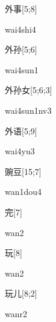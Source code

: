 \begin{verbete}{外事}[5;8]
\begin{pronuncia}{wai4shi4}
\end{pronuncia}
\end{verbete}

\begin{verbete}{外孙}[5;6]
\begin{pronuncia}{wai4sun1}
\end{pronuncia}
\end{verbete}

\begin{verbete}{外孙女}[5;6;3]
\begin{pronuncia}{wai4sun1nv3}
\end{pronuncia}
\end{verbete}

\begin{verbete}[wai4yu3]{外语}[5;9]
\begin{pronuncia}{wai4yu3}
\end{pronuncia}
\end{verbete}

\begin{verbete}{豌豆}[15;7]
\begin{pronuncia}{wan1dou4}
\end{pronuncia}
\end{verbete}

\begin{verbete}[wan2]{完}[7]
\begin{pronuncia}{wan2}
\end{pronuncia}
\end{verbete}

\begin{verbete}[wan2]{玩}[8]
\begin{pronuncia}{wan2}
\end{pronuncia}
\end{verbete}

\begin{verbete}[wanr2]{玩儿}[8;2]
\begin{pronuncia}{wanr2}
\end{pronuncia}
\end{verbete}

